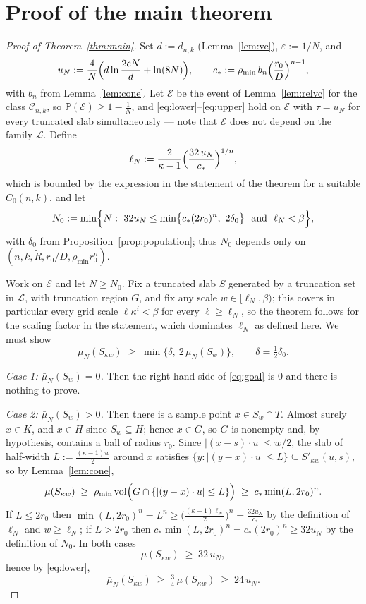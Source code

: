 \documentclass[11pt]{article}
\newcommand{\PP}{\mathbb{P}}
\newcommand{\emp}{\bar\mu_N}
\newcommand{\vol}{\operatorname{vol}}
\begin{document}
\section{Proof of the main theorem}\label{sec:empirical}

\begin{proof}[Proof of Theorem~\ref{thm:main}]
Set $d:=d_{n,k}$ (Lemma~\ref{lem:vc}), $\varepsilon:=1/N$, and
\[
u_N:=\frac4N\Bigl(d\ln\frac{2eN}{d}+\ln(8N)\Bigr),
\qquad
c_*:=\rho_{\min}\,b_n\Bigl(\frac{r_0}{D}\Bigr)^{n-1},
\]
with $b_n$ from Lemma~\ref{lem:cone}.  Let $\mathcal E$ be the event of
Lemma~\ref{lem:relvc} for the class $\mathcal C_{n,k}$, so
$\PP(\mathcal E)\ge1-\frac1N$, and \eqref{eq:lower}--\eqref{eq:upper} hold on
$\mathcal E$ with $\tau=u_N$ for every truncated slab simultaneously --- note that
$\mathcal E$ does not depend on the family $\mathcal L$.  Define
\[
\ell_N:=\frac{2}{\kappa-1}\Bigl(\frac{32\,u_N}{c_*}\Bigr)^{1/n},
\]
which is bounded by the expression in the statement of the theorem for a suitable
$C_0(n,k)$, and let
\[
N_0:=\min\Bigl\{N:\ 32u_N\le\min\bigl\{c_*(2r_0)^n,\ 2\delta_0\bigr\}
\ \text{ and }\ \ell_N<\beta\Bigr\},
\]
with $\delta_0$ from Proposition~\ref{prop:population}; thus $N_0$ depends only on
$(n,k,\widetilde R,r_0/D,\rho_{\min}r_0^n)$.

Work on $\mathcal E$ and let $N\ge N_0$.  Fix a truncated slab $S$ generated by a
truncation set in $\mathcal L$, with truncation region $G$, and fix any scale
$w\in[\ell_N,\beta)$; this covers in particular every grid scale
$\ell\kappa^i<\beta$ for every $\ell\ge\ell_N$, so the theorem follows for the
scaling factor in the statement, which dominates $\ell_N$ as defined here.  We must
show
\begin{equation}\label{eq:goal}
\emp(S_{\kappa w})\;\ge\;\min\bigl\{\delta,\ 2\,\emp(S_w)\bigr\},
\qquad
\delta=\tfrac12\delta_0 .
\end{equation}

\emph{Case 1: $\emp(S_w)=0$.}  Then the right-hand side of \eqref{eq:goal} is $0$
and there is nothing to prove.

\emph{Case 2: $\emp(S_w)>0$.}  Then there is a sample point $x\in S_w\cap T$.
Almost surely $x\in K$, and $x\in H$ since $S_w\subseteq H$; hence $x\in G$, so $G$
is nonempty and, by hypothesis, contains a ball of radius $r_0$.  Since
$|(x-s)\cdot u|\le w/2$, the slab of half-width $L:=\frac{(\kappa-1)w}2$ around $x$
satisfies $\{y:|(y-x)\cdot u|\le L\}\subseteq S'_{\kappa w}(u,s)$, so by
Lemma~\ref{lem:cone},
\[
\mu(S_{\kappa w})\;\ge\;\rho_{\min}\vol\Bigl(G\cap\{|(y-x)\cdot u|\le L\}\Bigr)
\;\ge\;c_*\min(L,2r_0)^n .
\]
If $L\le2r_0$ then $\min(L,2r_0)^n=L^n\ge\bigl(\frac{(\kappa-1)\ell_N}2\bigr)^n
=\frac{32u_N}{c_*}$ by the definition of $\ell_N$ and $w\ge\ell_N$; if $L>2r_0$ then
$c_*\min(L,2r_0)^n=c_*(2r_0)^n\ge32u_N$ by the definition of $N_0$.  In both cases
\begin{equation}\label{eq:mass-big}
\mu(S_{\kappa w})\;\ge\;32\,u_N,
\end{equation}
hence by \eqref{eq:lower},
\begin{equation}\label{eq:emp-big}
\emp(S_{\kappa w})\;\ge\;\tfrac34\,\mu(S_{\kappa w})\;\ge\;24\,u_N .
\end{equation}


\end{proof}
\end{document}
